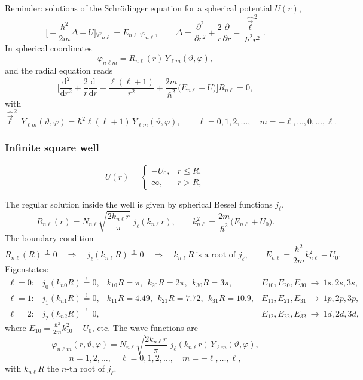 \documentclass[11pt,a4paper]{article}
\newcommand{\op}[1]{\hat{#1}}
\newcommand{\ud}{\mathrm{d}}
\begin{document}
Reminder: solutions of the Schr\"odinger equation for a spherical potential $U(r)$,
\[
\Big[-\frac{\hbar^2}{2m}\Delta+U\Big]\varphi_{n\ell}=E_{n\ell}\,\varphi_{n\ell},
\qquad
\Delta=\frac{\partial^2}{\partial r^2}+\frac2r\frac{\partial}{\partial r}-\frac{\op{\vec\ell}^{\,2}}{\hbar^2r^2}.
\]
In spherical coordinates
\[
\varphi_{n\ell m}=R_{n\ell}(r)\,Y_{\ell m}(\vartheta,\varphi),
\]
and the radial equation reads
\[
\Big[\frac{\ud^2}{\ud r^2}+\frac2r\frac{\ud}{\ud r}-\frac{\ell(\ell+1)}{r^2}+\frac{2m}{\hbar^2}\big(E_{n\ell}-U\big)\Big]R_{n\ell}=0,
\]
with
\[
\op{\vec\ell}^{\,2}\,Y_{\ell m}(\vartheta,\varphi)=\hbar^2\ell(\ell+1)\,Y_{\ell m}(\vartheta,\varphi),
\qquad \ell=0,1,2,\dots,\quad m=-\ell,\dots,0,\dots,\ell .
\]

\subsubsection*{Infinite square well}
\[
U(r)=\begin{cases}-U_0, & r\le R,\\ \infty, & r>R,\end{cases}
\]
\begin{center}
\end{center}
The regular solution inside the well is given by spherical Bessel functions $j_\ell$,
\[
R_{n\ell}(r)=N_{n\ell}\sqrt{\frac{2k_{n\ell}r}{\pi}}\;j_\ell(k_{n\ell}r),
\qquad
k_{n\ell}^2=\frac{2m}{\hbar^2}\big(E_{n\ell}+U_0\big).
\]
The boundary condition
\[
R_{n\ell}(R)\overset{!}{=}0\quad\Longrightarrow\quad j_\ell(k_{n\ell}R)\overset{!}{=}0
\quad\Longrightarrow\quad k_{n\ell}R\ \text{is a root of } j_\ell ,
\qquad
E_{n\ell}=\frac{\hbar^2}{2m}k_{n\ell}^2-U_0 .
\]
Eigenstates:
\[
\begin{array}{llll}
\ell=0: & j_0(k_{n0}R)\overset{!}{=}0, & k_{10}R=\pi,\ \ k_{20}R=2\pi,\ \ k_{30}R=3\pi, & E_{10},E_{20},E_{30}\ \to\ 1s,2s,3s,\\[1mm]
\ell=1: & j_1(k_{n1}R)\overset{!}{=}0, & k_{11}R=4.49,\ \ k_{21}R=7.72,\ \ k_{31}R=10.9, & E_{11},E_{21},E_{31}\ \to\ 1p,2p,3p,\\[1mm]
\ell=2: & j_2(k_{n2}R)\overset{!}{=}0, & & E_{12},E_{22},E_{32}\ \to\ 1d,2d,3d,
\end{array}
\]
where $E_{10}=\frac{\hbar^2}{2m}k_{10}^2-U_0$, etc.
The wave functions are
\[
\varphi_{n\ell m}(r,\vartheta,\varphi)=N_{n\ell}\sqrt{\frac{2k_{n\ell}r}{\pi}}\;j_\ell(k_{n\ell}r)\,Y_{\ell m}(\vartheta,\varphi),
\]
\[
n=1,2,\dots,\quad \ell=0,1,2,\dots,\quad m=-\ell,\dots,\ell,
\]
with $k_{n\ell}R$ the $n$-th root of $j_\ell$.
\end{document}
